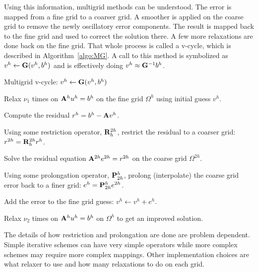Using this information, multigrid methods can be understood. The error is mapped from a fine grid to a coarser grid. A smoother is applied on the coarse grid to remove the newly oscillatory error components. The result is mapped back to the fine grid and used to correct the solution there. A few more relaxations are done back on the fine grid. That whole process is called a v-cycle, which is described in Algorithm~\ref{algo:MG}. A call to this method is symbolized as $v^h \leftarrow \mathbf{G}(v^h, b^h)$ and is effectively doing $v^{h} \approx \mathbf{G}^{-1}b^{h}$.
%
\begin{algorithm}
  \caption{ Multigrid v-cycle: $v^h \leftarrow \mathbf{G}(v^h, b^h)$}
  \label{algo:MG}
  \begin{list}{}{\hspace{2.5em}}
    \item Relax $\nu_1$ times on $\mathbf{A}^h u^h = b^h$ on the fine grid $\Omega^h$ using initial guess $v^h$.
    \item Compute the residual $r^h = b^h - \mathbf{A} v^h$. 
    \item Using some restriction operator, $\mathbf{R}_h^{2h}$, restrict the residual to a coarser grid: $r^{2h} =  \mathbf{R}_h^{2h} r^h$. 
    \item Solve the residual equation $\mathbf{A}^{2h} e^{2h} = r^{2h}$ on the coarse grid $\Omega^{2h}$. 
    \item Using some prolongation operator, $\mathbf{P}_{2h}^h$, prolong (interpolate) the coarse grid error back to a finer grid: $e^h = \mathbf{P}_{2h}^h e^{2h}$. 
    \item Add the error to the fine grid guess: $v^h \leftarrow v^h + e^h$. 
    \item Relax $\nu_2$ times on $\mathbf{A}^h u^h = b^h$ on $\Omega^h$ to get an improved solution. 
   \end{list}
\end{algorithm}

The details of how restriction and prolongation are done are problem dependent. Simple iterative schemes can have very simple operators while more complex schemes may require more complex mappings. Other implementation choices are what relaxer to use and how many relaxations to do on each grid.

